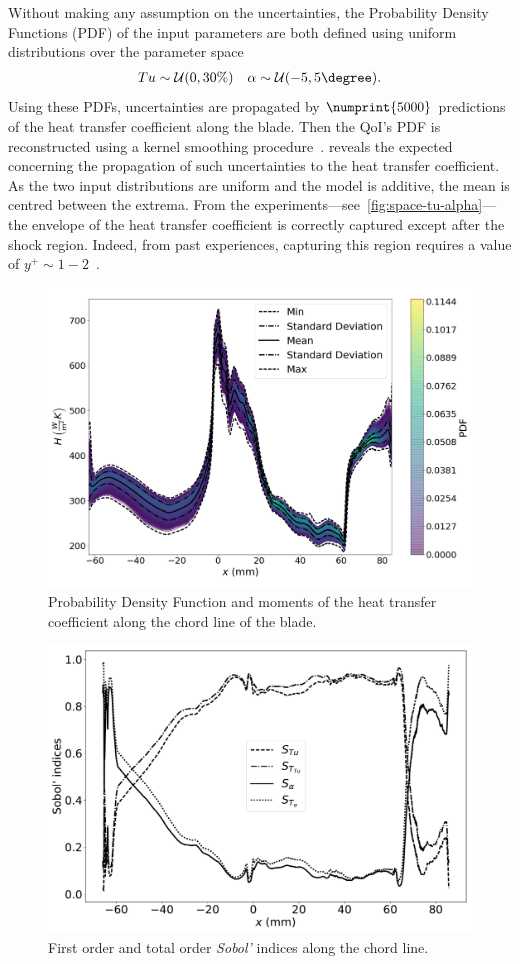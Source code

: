 Without making any assumption on the uncertainties, the Probability Density Functions (PDF) of the input parameters are both defined using uniform distributions over the parameter space
\begin{align}
Tu\sim \mathcal{U}(0,30\%) \quad \alpha \sim \mathcal{U}(-5,5\degree).
\end{align}
Using these PDFs, uncertainties are propagated by $\numprint{5000}$ predictions of the heat transfer coefficient along the blade. Then the QoI's PDF is reconstructed using a kernel smoothing procedure~\cite{wand1995,hastie2009}.  reveals the expected concerning the propagation of such uncertainties to the heat transfer coefficient. As the two input distributions are uniform and the model is additive, the mean is centred between the extrema. From the experiments---see~\cref{fig:space-tu-alpha}---the envelope of the heat transfer coefficient is correctly captured except after the shock region. Indeed, from past experiences, capturing this region requires a value of $y^+\sim 1-2$~\cite{Segui2017b}.

\begin{figure}[!h]
\centering
\includegraphics[width=0.7\linewidth]{fig/applications/ls89/13_2column_color-online-only_pdf-moments.pdf}
\caption{Probability Density Function and moments of the heat transfer coefficient along the chord line of the blade.}
\label{fig:ls89-propagation}
\end{figure}

\begin{figure}[h]
\centering
\includegraphics[width=0.7\linewidth]{fig/applications/ls89/14_2column_color-online-only_sensitivity_map.pdf}
\caption{First order and total order \textit{Sobol'} indices along the chord line.}
\label{fig:ls89-map}
\end{figure}

